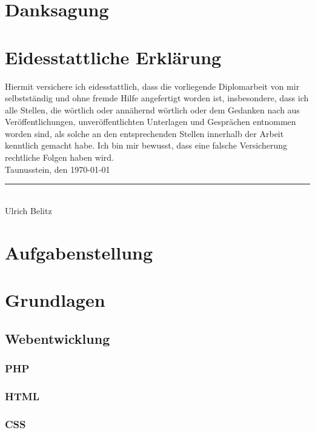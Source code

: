 \documentclass[12pt,a4paper,titlepage]{article} %
\begin{document}
\clearpage
\newpage

\section*{Danksagung}

\newpage

\section*{Eidesstattliche Erklärung}
Hiermit versichere ich eidesstattlich, dass die vorliegende Diplomarbeit von mir selbstständig und ohne fremde Hilfe angefertigt worden ist, insbesondere, dass ich alle Stellen, die wörtlich oder annähernd wörtlich oder dem Gedanken nach aus Veröffentlichungen, unveröffentlichten Unterlagen und Gesprächen entnommen worden sind, als solche an den entsprechenden Stellen innerhalb der Arbeit kenntlich gemacht habe. Ich bin mir bewusst, dass eine falsche Versicherung rechtliche Folgen haben wird.\\[10mm]
Taunusstein, den \today \\[15mm]
\noindent\rule[1pt]{0.40\textwidth}{1pt}\\
Ulrich Belitz
\newpage

\tableofcontents
\newpage

\listoffigures
\newpage

\listoftables
\newpage


\section{Aufgabenstellung} %

\section{Grundlagen}
\subsection{Webentwicklung}
\subsubsection{PHP}
\subsubsection{HTML}
\subsubsection{CSS}
\end{document}
